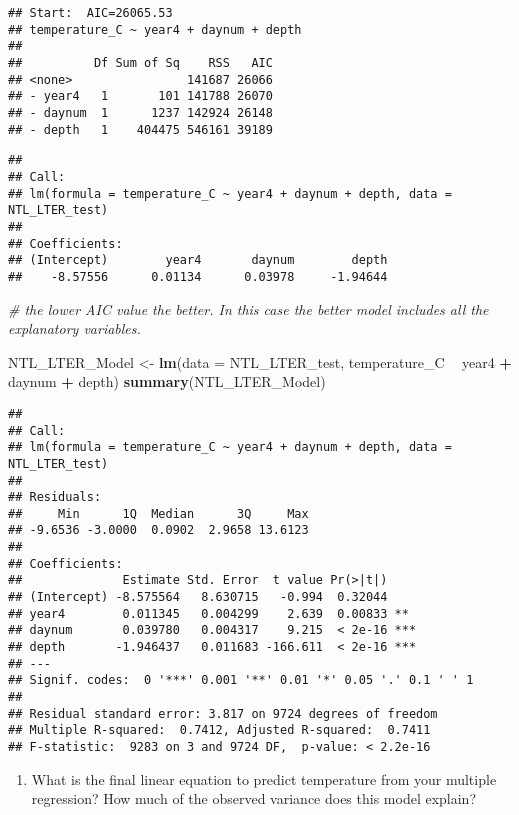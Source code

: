 \documentclass[]{article}
\newenvironment{Shaded}{\begin{snugshade}}{\end{snugshade}}
\newcommand{\KeywordTok}[1]{\textcolor[rgb]{0.13,0.29,0.53}{\textbf{#1}}}
\newcommand{\DataTypeTok}[1]{\textcolor[rgb]{0.13,0.29,0.53}{#1}}
\newcommand{\StringTok}[1]{\textcolor[rgb]{0.31,0.60,0.02}{#1}}
\newcommand{\CommentTok}[1]{\textcolor[rgb]{0.56,0.35,0.01}{\textit{#1}}}
\newcommand{\OperatorTok}[1]{\textcolor[rgb]{0.81,0.36,0.00}{\textbf{#1}}}
\newcommand{\NormalTok}[1]{#1}
\providecommand{\tightlist}{%
  \setlength{\itemsep}{0pt}\setlength{\parskip}{0pt}}
\begin{document}
\begin{verbatim}
## Start:  AIC=26065.53
## temperature_C ~ year4 + daynum + depth
## 
##          Df Sum of Sq    RSS   AIC
## <none>                141687 26066
## - year4   1       101 141788 26070
## - daynum  1      1237 142924 26148
## - depth   1    404475 546161 39189
\end{verbatim}

\begin{verbatim}
## 
## Call:
## lm(formula = temperature_C ~ year4 + daynum + depth, data = NTL_LTER_test)
## 
## Coefficients:
## (Intercept)        year4       daynum        depth  
##    -8.57556      0.01134      0.03978     -1.94644
\end{verbatim}

\begin{Shaded}
\begin{Highlighting}[]
\CommentTok{# the lower AIC value the better. In this case the better model includes all the explanatory variables.}

\NormalTok{NTL_LTER_Model <-}\StringTok{ }\KeywordTok{lm}\NormalTok{(}\DataTypeTok{data =}\NormalTok{ NTL_LTER_test, temperature_C }\OperatorTok{~}\StringTok{ }\NormalTok{year4 }\OperatorTok{+}\StringTok{ }\NormalTok{daynum }\OperatorTok{+}\StringTok{ }\NormalTok{depth)}
\KeywordTok{summary}\NormalTok{(NTL_LTER_Model)}
\end{Highlighting}
\end{Shaded}

\begin{verbatim}
## 
## Call:
## lm(formula = temperature_C ~ year4 + daynum + depth, data = NTL_LTER_test)
## 
## Residuals:
##     Min      1Q  Median      3Q     Max 
## -9.6536 -3.0000  0.0902  2.9658 13.6123 
## 
## Coefficients:
##              Estimate Std. Error  t value Pr(>|t|)    
## (Intercept) -8.575564   8.630715   -0.994  0.32044    
## year4        0.011345   0.004299    2.639  0.00833 ** 
## daynum       0.039780   0.004317    9.215  < 2e-16 ***
## depth       -1.946437   0.011683 -166.611  < 2e-16 ***
## ---
## Signif. codes:  0 '***' 0.001 '**' 0.01 '*' 0.05 '.' 0.1 ' ' 1
## 
## Residual standard error: 3.817 on 9724 degrees of freedom
## Multiple R-squared:  0.7412, Adjusted R-squared:  0.7411 
## F-statistic:  9283 on 3 and 9724 DF,  p-value: < 2.2e-16
\end{verbatim}

\begin{enumerate}
\def\labelenumi{\arabic{enumi}.}
\setcounter{enumi}{12}
\tightlist
\item
  What is the final linear equation to predict temperature from your
  multiple regression? How much of the observed variance does this model
  explain?
\end{enumerate}
\end{document}
